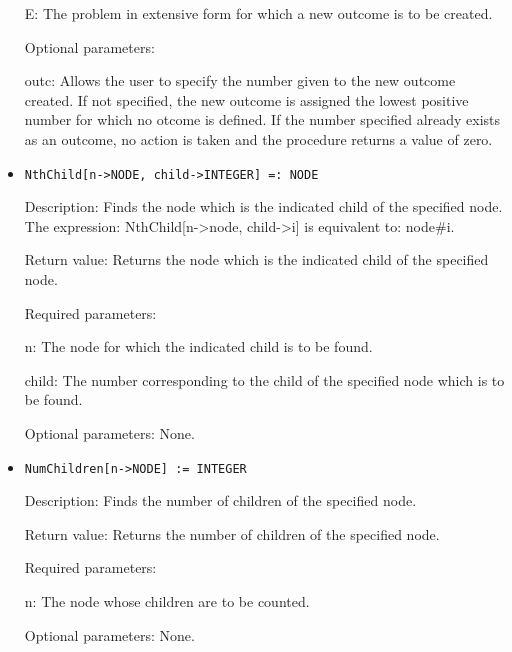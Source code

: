 \begin{itemize}
\bd
\item
[ E:] The problem in extensive form for which a new outcome is to
be created.
\ed

\item
[Optional parameters:]\hfil\null

\bd
\item
[ outc:] Allows the user to specify the number given to the new 
outcome created.  If not specified, the new outcome is assigned the 
lowest positive number for which no otcome is defined.  If the number
specified already exists as an outcome, no action is taken and the 
procedure returns a value of zero.
\ed
\ed

\item
\protect \large \begin{verbatim}
NthChild[n->NODE, child->INTEGER] =: NODE
\end{verbatim}\normalsize

\bd
\item
[Description:] Finds the node which is the indicated child of the 
specified node.  The expression: NthChild[n->node, child->i] is 
equivalent to:  node\#i.
\item
[Return value:] Returns the node which is the indicated child of the
specified node.
\item
[Required parameters:]\hfil\null
	  
\bd
\item
[ n:] The node for which the indicated child is to be found.
\item
[ child:] The number corresponding to the child of the specified 
node which is to be found.
\ed

\item 
[Optional parameters:] None.
\ed

\item
\protect \large \begin{verbatim}
NumChildren[n->NODE] := INTEGER
\end{verbatim}\normalsize

\bd
\item
[Description:] Finds the number of children of the specified node.
\item
[Return value:] Returns the number of children of the specified node.
\item
[Required parameters:]\hfil\null

\bd
\item
[ n:] The node whose children are to be counted.
\ed

\item
[Optional parameters:] None.
\ed


\end{itemize}
